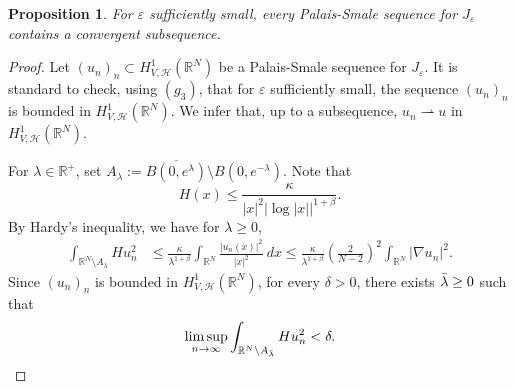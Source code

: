 \documentclass[a4paper]{amsart}
\newtheorem{proposition}{Proposition}[section]
\begin{document}
\begin{proposition}\label{prop:PS}
 For $\varepsilon$ sufficiently small, every Palais-Smale sequence for $J_{\varepsilon}$ contains a convergent subsequence.
\end{proposition}
\begin{proof}
 Let $(u_n)_n \subset H^1_{V,\mathcal{H}}({\mathbb{R}}^N)$ be a Palais-Smale sequence for $J_{\varepsilon}$. It is standard to check,
using $(g_3)$, that for $\varepsilon$ sufficiently small, the sequence $(u_n)_n$ is bounded in $H^1_{V,\mathcal{H}}({\mathbb{R}}^N)$.
We infer that, up to a subsequence, $u_n \rightharpoonup u$ in $H^1_{V,\mathcal{H}}({\mathbb{R}}^N)$. 

For $\lambda \in {\mathbb{R}}^+$, set $A_{\lambda} := \overline{B(0,e^\lambda)} \setminus B(0,e^{-\lambda})$. 
Note that 
\[
 H(x)\leq \frac{\kappa}{{\left| {x} \right|}^2 {\left| {\log {\left| {x} \right|}} \right|}^{1+\beta}}.
\]
By Hardy's inequality, we have for $\lambda \geq 0$, 
\begin{align*}
 \int_{{\mathbb{R}}^N\setminus A_{\lambda}} H u_n^2 &\leq \frac{\kappa}{\lambda^{1+\beta}}
\int_{{\mathbb{R}}^N} \frac{{\left| {u_n(x)} \right|}^2}{{\left| {x} \right|}^2}\: dx
 \leq \frac{\kappa}{\lambda^{1+\beta}} \left( \frac{2}{N-2} \right)^2
\int_{{\mathbb{R}}^N} {\left| {\nabla u_n} \right|}^2.
\end{align*}
Since $(u_n)_n$ is bounded in $H^1_{V,\mathcal{H}}({\mathbb{R}}^N)$, for every $\delta > 0$, there exists $\Bar{\lambda} \geq 0$
such that 
\begin{align}\label{ps:claim1}
 \limsup_{n \rightarrow \infty} \int_{{\mathbb{R}}^N\setminus A_{\Bar{\lambda}}} H u_n^2 < \delta.
\end{align}


\end{proof}
\end{document}
